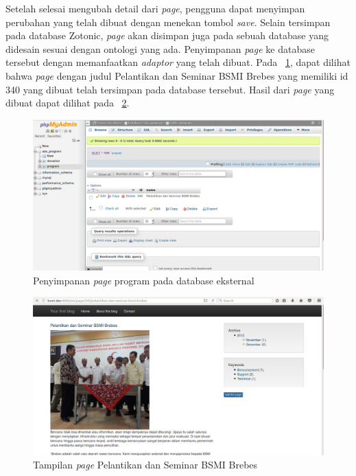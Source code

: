 Setelah selesai mengubah detail dari \textit{page}, pengguna dapat menyimpan perubahan yang telah dibuat dengan menekan tombol \textit{save}. Selain tersimpan pada database Zotonic, \textit{page} akan disimpan juga pada sebuah database yang didesain sesuai dengan ontologi yang ada. Penyimpanan \textit{page} ke database tersebut dengan memanfaatkan \textit{adaptor} yang telah dibuat. Pada \pic~\ref{fig:saveprogram}, dapat dilihat bahwa \textit{page} dengan judul Pelantikan dan Seminar BSMI Brebes yang memiliki id 340 yang dibuat telah tersimpan pada database tersebut. Hasil dari \textit{page} yang dibuat dapat dilihat pada \pic~\ref{fig:viewprogram}.
\begin{figure}
	\centering
	\includegraphics[width=1\textwidth]
	{pics/5-saveProgram.png}
	\caption{Penyimpanan \textit{page} program pada database eksternal}
	\label{fig:saveprogram}
\end{figure}
\vspace{-0.3cm}

\begin{figure}
	\centering
	\includegraphics[width=1\textwidth]
	{pics/5-viewProgram.png}
	\caption{Tampilan \textit{page} Pelantikan dan Seminar BSMI Brebes}
	\label{fig:viewprogram}
\end{figure}
\vspace{-0.3cm}

